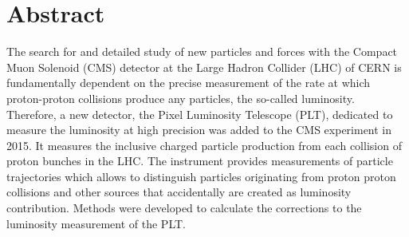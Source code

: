 \chapter*{Abstract}\label{ch:abstract}
The search for and detailed study of new particles and forces with the Compact Muon Solenoid (CMS) detector at the Large Hadron Collider (LHC) of CERN is fundamentally dependent on the precise measurement of the rate at which proton-proton collisions produce any particles, the so-called luminosity. 
Therefore, a new detector, the Pixel Luminosity Telescope (PLT), dedicated to measure the luminosity at high precision was added to the CMS experiment in 2015.
It measures the inclusive charged particle production from each collision of proton bunches in the LHC. The instrument provides measurements of particle trajectories which allows to distinguish particles originating from proton proton collisions and other sources that accidentally are created as luminosity contribution.
Methods were developed to calculate the corrections to the luminosity measurement of the PLT.

